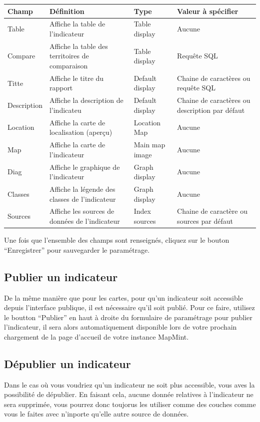 \documentclass[letterpaper,10pt,french]{sphinxmanual}
\begin{document}
\begin{tabulary}{\linewidth}{|L|L|L|L|}
\hline

\textbf{Champ}
 & 
\textbf{Définition}
 & 
\textbf{Type}
 & 
\textbf{Valeur à spécifier}
\\
\hline
Table
 & 
Affiche la table de l'indicateur
 & 
Table display
 & 
Aucune
\\
\hline
Compare
 & 
Affiche la table des territoires de comparaison
 & 
Table display
 & 
Requête SQL
\\
\hline
Titte
 & 
Affiche le titre du rapport
 & 
Default display
 & 
Chaine de caractères ou requête SQL
\\
\hline
Description
 & 
Affiche la description de l'indicateu
 & 
Default display
 & 
Chaine de caractères ou description par défaut
\\
\hline
Location
 & 
Affiche la carte de localisation (aperçu)
 & 
Location Map
 & 
Aucune
\\
\hline
Map
 & 
Affiche la carte de l'indicateur
 & 
Main map image
 & 
Aucune
\\
\hline
Diag
 & 
Affiche le graphique de l'indicateur
 & 
Graph display
 & 
Aucune
\\
\hline
Classes
 & 
Affiche la légende des classes de l'indicateur
 & 
Graph display
 & 
Aucune
\\
\hline
Sources
 & 
Affiche les sources de données de l'indicateur
 & 
Index sources
 & 
Chaine de caractère ou sources par défaut
\\
\hline\end{tabulary}


Une fois que l'ensemble des champs sont renseignés, cliquez sur le bouton ``Enregistrer'' pour sauvegarder le paramétrage.


\subsection{Publier un indicateur}
\label{indicators/indicatorspanel:publier-un-indicateur}
De la même manière que pour les cartes, pour qu'un indicateur soit
accessible depuis l'interface publique, il est nécessaire qu'il soit
publié. Pour ce faire, utilisez le boutton ``Publier'' en haut à droite du
formulaire de paramétrage pour publier l'indicateur, il sera alors
automatiquement disponible lors de votre prochain chargement de la
page d'accueil de votre instance MapMint.


\subsection{Dépublier un indicateur}
\label{indicators/indicatorspanel:depublier-un-indicateur}
Dans le cas où vous voudriez qu'un indicateur ne soit plus accessible,
vous aves la possibilité de dépublier. En faisant cela, aucune donnée
relatives à l'indicateur ne sera supprimée, vous pourrez donc
toujorus les utiliser comme des couches comme vous le faites avec
n'inporte qu'elle autre source de données.
\end{document}

